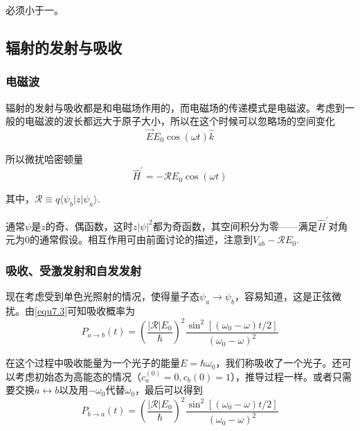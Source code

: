 \documentclass[UTF8]{ctexart}
\begin{document}
\noindent 必须小于一。

    \subsection{辐射的发射与吸收}
    \subsubsection{电磁波}
    辐射的发射与吸收都是和电磁场作用的，而电磁场的传递模式是电磁波。考虑到一般的电磁波的波长都远大于原子大小，所以在这个时候可以忽略场的空间变化
    \begin{equation}
        \vec{E} E_0 \cos (\omega t) \hat{k}
    \end{equation}

\noindent 所以微扰哈密顿量
\begin{equation}
    \hat{H}^{\prime} = - \mathcal{R} E_0 \cos (\omega t)
\end{equation}

\noindent 其中，$\mathcal{R} \equiv q \langle \psi_b | z | \psi_a \rangle $.

    通常$\psi$是$z$的奇、偶函数，这时$z |\psi|^2 $都为奇函数，其空间积分为零——满足$\hat{H}^{\prime}$对角元为0的通常假设。相互作用可由前面讨论的描述，注意到$V_{ab} - \mathcal{R} E_0$.

    \subsubsection{吸收、受激发射和自发发射}
    现在考虑受到单色光照射的情况，使得量子态$\psi_a \to \psi_b$，容易知道，这是正弦微扰。由\autoref{equ7.3}可知吸收概率为
    \begin{equation}
        P_{a \rightarrow b}(t)=\left(\frac{|\mathcal{R}| E_{0}}{\hbar}\right)^{2} \frac{\sin ^{2}\left[\left(\omega_{0}-\omega\right) t / 2\right]}{\left(\omega_{0}-\omega\right)^{2}}
    \end{equation}

\noindent 在这个过程中吸收能量为一个光子的能量$E = \hbar \omega_0$，我们称吸收了一个光子。还可以考虑初始态为高能态的情况（$c_a^(0)=0,c_b(0)=1$），推导过程一样。或者只需要交换$a \leftrightarrow b$以及用$- \omega_0$代替$\omega_0$，最后可以得到
\begin{equation}
    P_{b \rightarrow a}(t)=\left(\frac{|\mathcal{R}| E_{0}}{\hbar}\right)^{2} \frac{\sin ^{2}\left[\left(\omega_{0}-\omega\right) t / 2\right]}{\left(\omega_{0}-\omega\right)^{2}}
\end{equation}
\end{document}
